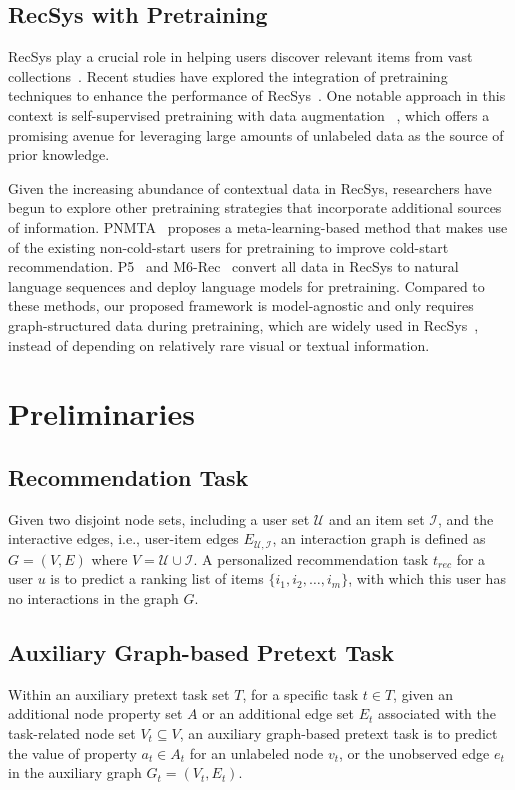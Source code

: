 \subsection{RecSys with Pretraining}
RecSys play a crucial role in helping users discover relevant items from vast collections~\cite{glrssurvey21, LightGCN, cfag}. Recent studies have explored the integration of pretraining techniques to enhance the performance of RecSys~\cite{Xu2022, yuwei23}. One notable approach in this context is self-supervised pretraining with data augmentation
~\cite{sgl, s3rec}, 
which offers a promising avenue for leveraging large amounts of unlabeled data as the source of prior knowledge.

Given the increasing abundance of contextual data in RecSys, researchers have begun to explore other pretraining strategies that incorporate additional sources of information.
PNMTA~\cite{pnmta} proposes a meta-learning-based method that makes use of the existing non-cold-start users for pretraining to improve cold-start recommendation. 
P5~\cite{p5} and M6-Rec~\cite{m6rec} convert all data in RecSys to natural language sequences and deploy language models for pretraining. 
Compared to these methods, our proposed framework is model-agnostic and only requires graph-structured data during pretraining, which are widely used in RecSys~\cite{glrssurvey21}, instead of depending on relatively rare visual or textual information.

\section{Preliminaries}
\subsection{Recommendation Task}
Given two disjoint node sets, including a user set $\mathcal{U}$ and an item set $\mathcal{I}$, and the interactive edges, i.e., user-item edges $E_{\mathcal{U},\mathcal{I}}$, an interaction graph is defined as $G=(V,E)$ where $V = \mathcal{U} \cup \mathcal{I}$. A personalized recommendation task  $t_{rec}$ for a user $u$ is to predict a ranking list of items $\{i_1, i_2, \dots, i_m\}$, with which this user has no interactions in the graph $G$.

\subsection{Auxiliary Graph-based Pretext Task}
Within an auxiliary pretext task set $T$, for a specific task $t\in T$, given an additional node property set $A$ or an additional edge set $E_{t}$ associated with the task-related node set $V_t\subseteq V$, an auxiliary graph-based pretext task is to predict the value of property $a_t\in A_t$ for an unlabeled node $v_t$, or the unobserved edge $e_t$ in the auxiliary graph $G_t=(V_t,E_t)$.


